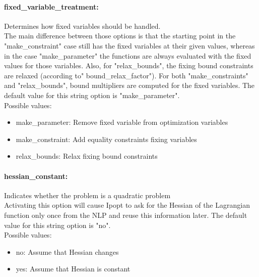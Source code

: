 \paragraph{fixed\_variable\_treatment:}\label{sec:fixed_variable_treatment} Determines how fixed variables should be handled. $\;$ \\
 The main difference between those options is that
the starting point in the "make\_constraint" case
still has the fixed variables at their given
values, whereas in the case "make\_parameter" the
functions are always evaluated with the fixed
values for those variables.  Also, for
"relax\_bounds", the fixing bound constraints are
relaxed (according to" bound\_relax\_factor").
For both "make\_constraints" and "relax\_bounds",
bound multipliers are computed for the fixed
variables.
The default value for this string option is "make\_parameter".
\\ 
Possible values:
\begin{itemize}
   \item make\_parameter: Remove fixed variable from optimization
variables
   \item make\_constraint: Add equality constraints fixing variables
   \item relax\_bounds: Relax fixing bound constraints
\end{itemize}

\paragraph{hessian\_constant:}\label{sec:hessian_constant} Indicates whether the problem is a quadratic problem $\;$ \\
 Activating this option will cause Ipopt to ask
for the Hessian of the Lagrangian function only
once from the NLP and reuse this information
later.
The default value for this string option is "no".
\\ 
Possible values:
\begin{itemize}
   \item no: Assume that Hessian changes
   \item yes: Assume that Hessian is constant
\end{itemize}

